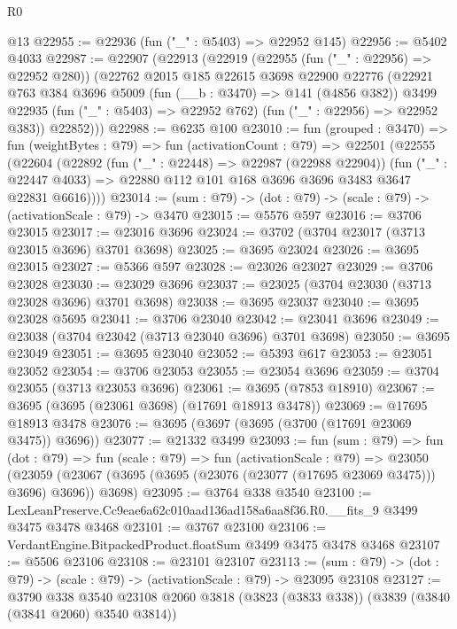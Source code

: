 \begin{lexlean}{R0}
\begin{coremodule}
    @13
@22955 := @22936 (fun ("_" : @5403) => @22952 @145)
@22956 := @5402 @4033
@22987 := @22907
    (@22913
      (@22919
        (@22955 (fun ("_" : @22956) => @22952 @280))
        (@22762
          @2015
          @185
          @22615
          @3698
          @22900
          @22776
          (@22921
            @763
            @384
            @3696
            @5009
            (fun (__b : @3470) => @141 (@4856 @382))
            @3499
            @22935
            (fun ("_" : @5403) => @22952 @762)
            (fun ("_" : @22956) => @22952 @383))
          @22852)))
@22988 := @6235 @100
@23010 := fun (grouped : @3470) =>
  fun (weightBytes : @79) =>
  fun (activationCount : @79) =>
  @22501
    (@22555
      (@22604
        (@22892
          (fun ("_" : @22448) => @22987 (@22988 @22904))
          (fun ("_" : @22447 @4033) =>
          @22880 @112 @101 @168 @3696 @3696 @3483 @3647 @22831 @6616))))
@23014 := (sum : @79) -> (dot : @79) -> (scale : @79) -> (activationScale : @79) -> @3470
@23015 := @5576 @597
@23016 := @3706 @23015
@23017 := @23016 @3696
@23024 := @3702 (@3704 @23017 (@3713 @23015 @3696) @3701 @3698)
@23025 := @3695 @23024
@23026 := @3695 @23015
@23027 := @5366 @597
@23028 := @23026 @23027
@23029 := @3706 @23028
@23030 := @23029 @3696
@23037 := @23025 (@3704 @23030 (@3713 @23028 @3696) @3701 @3698)
@23038 := @3695 @23037
@23040 := @3695 @23028 @5695
@23041 := @3706 @23040
@23042 := @23041 @3696
@23049 := @23038 (@3704 @23042 (@3713 @23040 @3696) @3701 @3698)
@23050 := @3695 @23049
@23051 := @3695 @23040
@23052 := @5393 @617
@23053 := @23051 @23052
@23054 := @3706 @23053
@23055 := @23054 @3696
@23059 := @3704 @23055 (@3713 @23053 @3696)
@23061 := @3695 (@7853 @18910)
@23067 := @3695 (@3695 (@23061 @3698) (@17691 @18913 @3478))
@23069 := @17695 @18913 @3478
@23076 := @3695 (@3697 (@3695 (@3700 (@17691 @23069 @3475)) @3696))
@23077 := @21332 @3499
@23093 := fun (sum : @79) =>
  fun (dot : @79) =>
  fun (scale : @79) =>
  fun (activationScale : @79) =>
  @23050 (@23059 (@23067 (@3695 (@3695 (@23076 (@23077 (@17695 @23069 @3475))) @3696) @3696)) @3698)
@23095 := @3764 @338 @3540
@23100 := LexLeanPreserve.Cc9eae6a62c010aad136ad158a6aa8f36.R0.__fits_9 @3499 @3475 @3478 @3468
@23101 := @3767 @23100
@23106 := VerdantEngine.BitpackedProduct.floatSum @3499 @3475 @3478 @3468
@23107 := @5506 @23106
@23108 := @23101 @23107
@23113 := (sum : @79) -> (dot : @79) -> (scale : @79) -> (activationScale : @79) -> @23095 @23108
@23127 := @3790
    @338
    @3540
    @23108
    @2060
    @3818
    (@3823 (@3833 @338))
    (@3839 (@3840 (@3841 @2060) @3540 @3814))

\end{coremodule}
\end{lexlean}
